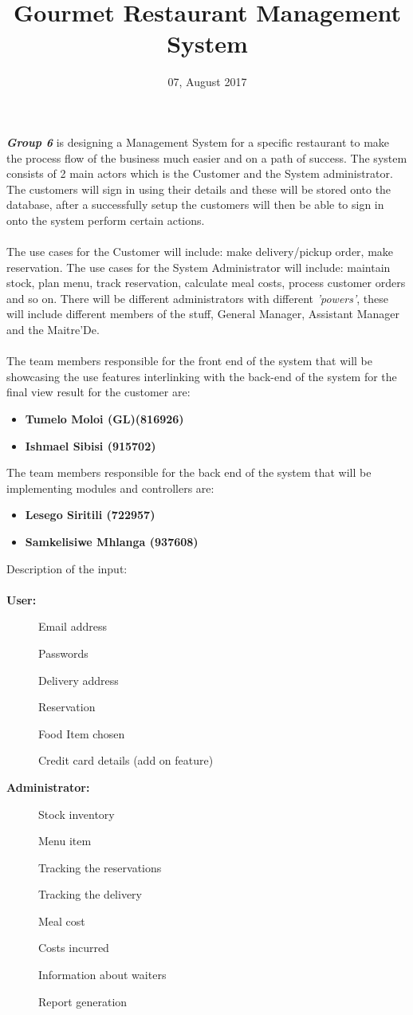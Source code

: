 \documentclass[a4paper,10pt]{article}
\title{Gourmet Restaurant Management System}
\date{07, August 2017}
\begin{document}
\maketitle
\textit{\textbf{Group 6}} is designing a Management System for a specific restaurant to make the process flow of the business much easier and on a path of success. The system consists of 2 main actors which is the Customer and the System administrator. The customers will sign in using their details and these will be stored onto the database, after a successfully setup the customers will then be able to sign in onto the system perform certain actions.
\\ \\
The use cases for the Customer will include: make delivery/pickup order, make reservation.
The use cases for the System Administrator will include: maintain stock, plan menu, track reservation, calculate meal costs, process customer orders and so on. There will be different administrators with different \textit{'powers'}, these will include different members of the stuff, General Manager, Assistant Manager and the Maitre’De.
\\ \\
The team members responsible for the front end of the system that will be showcasing the use features interlinking with the back-end of the system for the final view result for the customer are:
\begin{itemize}
	\item \textbf{Tumelo Moloi (GL)(816926) }
	\item \textbf{Ishmael Sibisi (915702) }
\end{itemize}
The team members responsible for the back end of the system that will be implementing modules and controllers are:
\begin{itemize}
	\item \textbf{Lesego Siritili (722957) }
	\item \textbf{Samkelisiwe Mhlanga (937608) }
\end{itemize}
Description of the input:\\ \\
\textbf{User:}
\begin{description}
	\item[] Email address
	\item[] Passwords
	\item[] Delivery address
	\item[] Reservation
	\item[] Food Item chosen
	\item[] Credit card details (add on feature)
\end{description}
\pagebreak
\textbf{Administrator:}
\begin{description}
	\item[] Stock inventory
	\item[] Menu item
	\item[] Tracking the reservations
	\item[] Tracking the delivery
	\item[] Meal cost
	\item[] Costs incurred
	\item[] Information about waiters
	\item[] Report generation
\end{description}
\medskip
\end{document}
